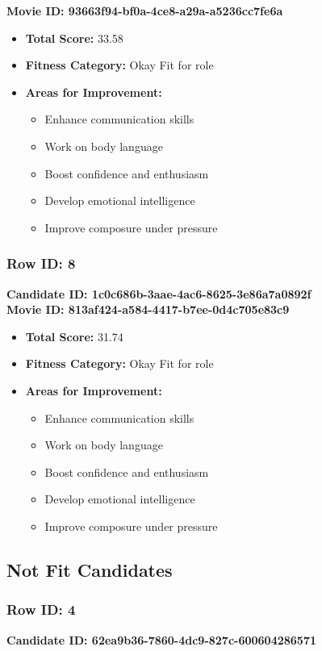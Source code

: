 \documentclass{article}
\begin{document}
\textbf{Movie ID: 93663f94-bf0a-4ce8-a29a-a5236cc7fe6a}
\begin{itemize}
    \item \textbf{Total Score:} 33.58
    \item \textbf{Fitness Category:} Okay Fit for role
    \item \textbf{Areas for Improvement:}
    \begin{itemize}
        \item Enhance communication skills
        \item Work on body language
        \item Boost confidence and enthusiasm
        \item Develop emotional intelligence
        \item Improve composure under pressure
    \end{itemize}
\end{itemize}

\subsubsection{Row ID: 8}
\textbf{Candidate ID: 1c0c686b-3aae-4ac6-8625-3e86a7a0892f}\\

\textbf{Movie ID: 813af424-a584-4417-b7ee-0d4c705e83c9}
\begin{itemize}
    \item \textbf{Total Score:} 31.74
    \item \textbf{Fitness Category:} Okay Fit for role
    \item \textbf{Areas for Improvement:}
    \begin{itemize}
        \item Enhance communication skills
        \item Work on body language
        \item Boost confidence and enthusiasm
        \item Develop emotional intelligence
        \item Improve composure under pressure
    \end{itemize}
\end{itemize}

\subsection{Not Fit Candidates}

\subsubsection{Row ID: 4}
\textbf{Candidate ID: 62ea9b36-7860-4dc9-827c-600604286571}\\
\end{document}
